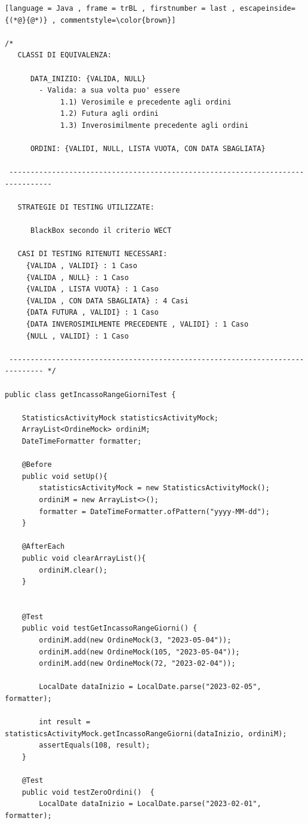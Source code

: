 \begin{lstlisting}[language = Java , frame = trBL , firstnumber = last , escapeinside={(*@}{@*)} , commentstyle=\color{brown}]

/*
   CLASSI DI EQUIVALENZA:
   
      DATA_INIZIO: {VALIDA, NULL}
        - Valida: a sua volta puo' essere
             1.1) Verosimile e precedente agli ordini
             1.2) Futura agli ordini
             1.3) Inverosimilmente precedente agli ordini

      ORDINI: {VALIDI, NULL, LISTA VUOTA, CON DATA SBAGLIATA}

 --------------------------------------------------------------------------------

   STRATEGIE DI TESTING UTILIZZATE:

      BlackBox secondo il criterio WECT
      
   CASI DI TESTING RITENUTI NECESSARI:
     {VALIDA , VALIDI} : 1 Caso
     {VALIDA , NULL} : 1 Caso
     {VALIDA , LISTA VUOTA} : 1 Caso
     {VALIDA , CON DATA SBAGLIATA} : 4 Casi
     {DATA FUTURA , VALIDI} : 1 Caso
     {DATA INVEROSIMILMENTE PRECEDENTE , VALIDI} : 1 Caso
     {NULL , VALIDI} : 1 Caso

 ------------------------------------------------------------------------------ */  

public class getIncassoRangeGiorniTest {

    StatisticsActivityMock statisticsActivityMock;
    ArrayList<OrdineMock> ordiniM;
    DateTimeFormatter formatter;

    @Before
    public void setUp(){
        statisticsActivityMock = new StatisticsActivityMock();
        ordiniM = new ArrayList<>();
        formatter = DateTimeFormatter.ofPattern("yyyy-MM-dd");
    }

    @AfterEach
    public void clearArrayList(){
        ordiniM.clear();
    }


    @Test
    public void testGetIncassoRangeGiorni() {
        ordiniM.add(new OrdineMock(3, "2023-05-04"));
        ordiniM.add(new OrdineMock(105, "2023-05-04"));
        ordiniM.add(new OrdineMock(72, "2023-02-04"));

        LocalDate dataInizio = LocalDate.parse("2023-02-05", formatter);

        int result = statisticsActivityMock.getIncassoRangeGiorni(dataInizio, ordiniM);
        assertEquals(108, result);
    }

    @Test
    public void testZeroOrdini()  {
        LocalDate dataInizio = LocalDate.parse("2023-02-01", formatter);


\end{lstlisting}
